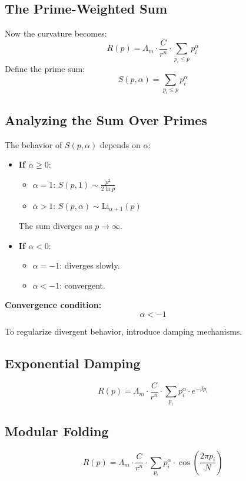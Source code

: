 \documentclass{article}
\theoremstyle{plain}
\theoremstyle{claimstyle}
\begin{document}
\subsection{The Prime-Weighted Sum}

Now the curvature becomes:
\[
R(p) = \Lambda_m \cdot \frac{C}{r^n} \cdot \sum_{p_i \leq p} p_i^\alpha
\]
Define the prime sum:
\[
S(p, \alpha) = \sum_{p_i \leq p} p_i^\alpha
\]

\subsection{Analyzing the Sum Over Primes}

The behavior of \( S(p, \alpha) \) depends on \( \alpha \):
\begin{itemize}
    \item \textbf{If \( \alpha \geq 0 \)}:
    \begin{itemize}
        \item \( \alpha = 1 \): \( S(p, 1) \sim \frac{p^2}{2 \ln p} \)
        \item \( \alpha > 1 \): \( S(p, \alpha) \sim \mathrm{Li}_{\alpha+1}(p) \)
    \end{itemize}
    The sum diverges as \( p \to \infty \).
    
    \item \textbf{If \( \alpha < 0 \)}:
    \begin{itemize}
        \item \( \alpha = -1 \): diverges slowly.
        \item \( \alpha < -1 \): convergent.
    \end{itemize}
\end{itemize}

\textbf{Convergence condition:}
\[
\alpha < -1
\]

To regularize divergent behavior, introduce damping mechanisms.

\subsection{Exponential Damping}
\[
R(p) = \Lambda_m \cdot \frac{C}{r^n} \cdot \sum_{p_i} p_i^\alpha \cdot e^{-\beta p_i}
\]

\subsection{Modular Folding}
\[
R(p) = \Lambda_m \cdot \frac{C}{r^n} \cdot \sum_{p_i} p_i^\alpha \cdot \cos\left(\frac{2\pi p_i}{N}\right)
\]
\end{document}
